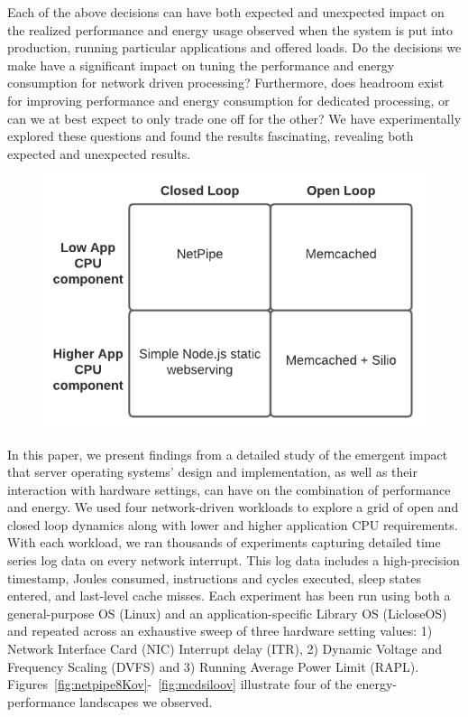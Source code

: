 Each of the above decisions can have both expected and unexpected impact on the realized performance and energy usage observed when the system is put into production, running particular applications and offered loads. 
Do the decisions we make have a significant impact on tuning the performance and energy consumption for network driven processing?  
Furthermore, does headroom exist for improving performance and energy consumption for dedicated processing, or can we at best expect to only trade one off for the other?
We have experimentally explored these questions and found the results fascinating, revealing both expected and unexpected results.


\begin{figure}
\vspace{-0.5cm}
\centering
\begin{center}
\includegraphics[width=.6\columnwidth]{figures/expgrid.pdf}
\vspace{-1cm}
\end{center}    
\end{figure}  


In this paper, we present findings from a detailed study of the emergent impact that server operating systems' design and implementation, as well as their interaction with hardware settings, can have on the combination of performance and energy.
We used four network-driven workloads to explore a grid of open and closed loop dynamics along with lower and higher application CPU requirements. 
With each workload, we ran thousands of experiments capturing detailed time series log data on every network interrupt.
This log data includes a high-precision timestamp, Joules consumed, instructions and cycles executed, sleep states entered, and last-level cache misses.
Each experiment has been run using both a general-purpose OS (Linux) and an application-specific Library OS (LicloseOS) and repeated across an exhaustive sweep of three hardware setting values: 1) Network Interface Card (NIC) Interrupt delay (ITR), 2) Dynamic Voltage and Frequency Scaling (DVFS) and 3) Running Average Power Limit (RAPL).
Figures~\ref{fig:netpipe8Kov}-~\ref{fig:mcdsiloov} illustrate four of the energy-performance landscapes we observed.  
 
